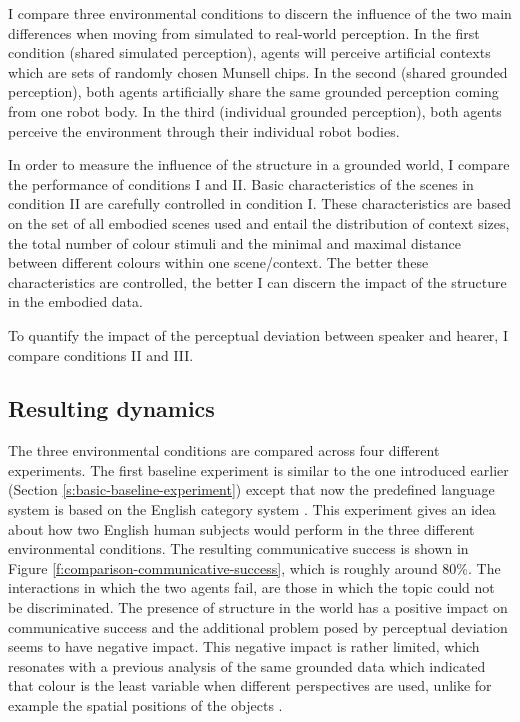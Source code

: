 I compare three environmental conditions to discern the influence of
the two main differences when moving from simulated to real-world
perception. In the first condition (shared simulated perception),
agents will perceive artificial contexts which are sets of randomly
chosen Munsell chips. In the second (shared grounded perception), both
agents artificially share the same grounded perception coming from one
robot body. In the third (individual grounded perception), both agents
perceive the environment through their individual robot bodies.

In order to measure the influence of the structure in a grounded
world, I compare the performance of conditions I and II. Basic
characteristics of the scenes in condition II are carefully controlled
in condition I. These characteristics are based on the set of all
embodied scenes used and entail the distribution of context sizes, the
total number of colour stimuli and the minimal and maximal distance
between different colours within one scene/context. The better these
characteristics are controlled, the better I can discern the impact of
the structure in the embodied data.

To quantify the impact of the perceptual deviation between speaker and
hearer, I compare conditions II and III.

\subsection{Resulting dynamics}

The three environmental conditions are compared across four different
experiments. The first baseline experiment is similar to the one
introduced earlier (Section \ref{s:basic-baseline-experiment}) except
that now the predefined language system is based on the English
category system \citep{sturges95location}. This experiment gives an
idea about how two English human subjects would perform in the three
different environmental conditions. The resulting communicative
success is shown in Figure \ref{f:comparison-communicative-success},
which is roughly around 80\%. The interactions in which the two agents
fail, are those in which the topic could not be discriminated. The
presence of structure in the world has a positive impact on
communicative success and the additional problem posed by perceptual
deviation seems to have negative impact. This negative impact is
rather limited, which resonates with a previous analysis of the same
grounded data which indicated that colour is the least variable when
different perspectives are used, unlike for example the spatial
positions of the objects \citep{wellens08flexible}.

